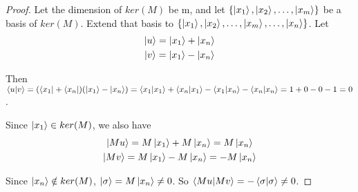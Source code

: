\begin{proof}

Let the dimension of $ker(M)$ be m, and let $\{\ket{x_1}, \ket{x_2},\hdots, \ket{x_m}\}$ be a basis of $ker(M)$. Extend that basis to $\{\ket{x_1}, \ket{x_2},\hdots, \ket{x_m}, \hdots, \ket{x_n}\}$. Let
\begin{gather*}
    \ket{u}=\ket{x_1}+\ket{x_n}\\
    \ket{v}=\ket{x_1}-\ket{x_n}
\end{gather*}

Then $\braket{u|v}=(\bra{x_1}+\bra{x_n})(\ket{x_1}-\ket{x_n})=\braket{x_1|x_1}+\braket{x_n|x_1}-\braket{x_1|x_n}-\braket{x_n|x_n}=1+0-0-1=0$.

Since $\ket{x_1} \in ker(M)$, we also have
\begin{gather*}
    \ket{Mu}=M\ket{x_1}+M\ket{x_n}=M\ket{x_n}\\
    \ket{Mv}=M\ket{x_1}-M\ket{x_n}=-M\ket{x_n}    
\end{gather*}

Since $\ket{x_n} \notin ker(M)$, $\ket{\sigma}=M\ket{x_n} \ne 0$. So $\braket{Mu|Mv}=-\braket{\sigma|\sigma} \ne 0$.
\end{proof}

